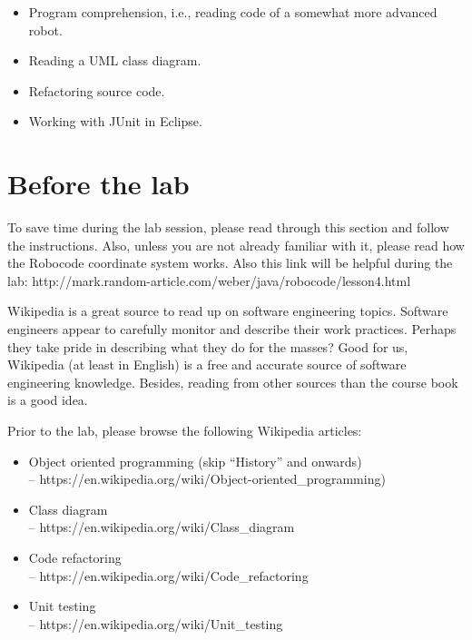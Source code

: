 \documentclass{scrreprt}
\begin{document}
\begin{itemize}
\item Program comprehension, i.e., reading code of a somewhat more advanced robot.
\item Reading a UML class diagram.
\item Refactoring source code.
\item Working with JUnit in Eclipse.
\end{itemize}

\chapter{Before the lab}
To save time during the lab session, please read through this section and follow the instructions. Also, unless you are not already familiar with it, please read how the Robocode coordinate system works. Also this link will be helpful during the lab: http://mark.random-article.com/weber/java/robocode/lesson4.html

Wikipedia is a great source to read up on software engineering topics. Software engineers appear to carefully monitor and describe their work practices. Perhaps they take pride in describing what they do for the masses? Good for us, Wikipedia (at least in English) is a free and accurate source of software engineering knowledge. Besides, reading from other sources than the course book is a good idea.

Prior to the lab, please browse the following Wikipedia articles:

\begin{itemize}
\item Object oriented programming (skip ``History'' and onwards)\\-- https://en.wikipedia.org/wiki/Object-oriented_programming)
\item Class diagram\\-- https://en.wikipedia.org/wiki/Class_diagram
\item Code refactoring\\-- https://en.wikipedia.org/wiki/Code_refactoring
\item Unit testing\\-- https://en.wikipedia.org/wiki/Unit_testing
\end{itemize}
\end{document}
